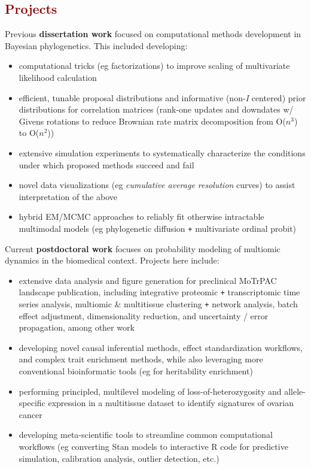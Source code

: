\documentclass[11pt,margin,line]{resume}
\begin{document}
\begin{resume}
\vspace{-1.5mm}
\section{\large\textcolor{DarkRed}{Projects}}

Previous \textbf{dissertation work} focused on computational methods development in Bayesian phylogenetics. This included developing:

    \begin{itemize}

    \setlength\itemsep{-0.2em}
         \item  computational tricks (eg factorizations) to improve scaling of multivariate likelihood calculation
         \item  efficient, tunable proposal distributions and informative (non-\textit{I} centered) prior distributions for correlation matrices (rank-one updates and downdates w/ Givens rotations to reduce Brownian rate matrix decomposition from O($n^3$) to O($n^2$))
         \item extensive simulation experiments to systematically characterize the conditions under which proposed methods succeed and fail
         \item novel data visualizations (eg \textit{cumulative average resolution} curves) to assist interpretation of the above
         \item hybrid EM/MCMC approaches to reliably fit otherwise intractable multimodal models (eg phylogenetic diffusion \texttt{+} multivariate ordinal probit)
         
    \end{itemize}

\vspace{-5mm}
Current \textbf{postdoctoral work} focuses on probability modeling of multiomic dynamics in the biomedical context. Projects here include:

    \begin{itemize}

    \setlength\itemsep{-0.2em}
         \item  extensive data analysis and figure generation for preclinical MoTrPAC landscape publication, including integrative proteomic \texttt{+} transcriptomic time series analysis, multiomic \& multitissue clustering \texttt{+} network analysis, batch effect adjustment, dimensionality reduction, and uncertainty / error propagation, among other work
	\item developing novel causal inferential methods, effect standardization workflows, and complex trait enrichment methods, while also leveraging more conventional bioinformatic tools (eg for heritability enrichment)
	\item performing principled, multilevel modeling of loss-of-heterozygosity and allele-specific expression in a multitissue dataset to identify signatures of ovarian cancer
	\item developing meta-scientific tools to streamline common computational workflows (eg converting Stan models to interactive R code for predictive simulation, calibration analysis, outlier detection, etc.)
	         

\end{itemize}
\end{resume}
\end{document}

